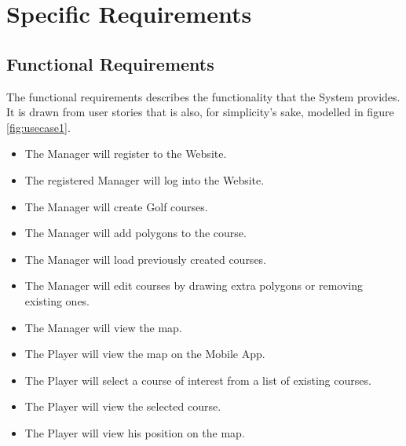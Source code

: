 \documentclass{article}
\begin{document}
    \newpage

    \section{Specific Requirements}

    \subsection{Functional Requirements}
    The functional requirements describes the functionality that the System provides. It is drawn from user stories that is also, for simplicity's sake, modelled in figure \ref{fig:usecase1}.
    \begin{itemize}
        \item
            The Manager will register to the Website.
        \item
            The registered Manager will log into the Website.
        \item
            The Manager will create Golf courses.
        \item
            The Manager will add polygons to the course.
        \item
            The Manager will load previously created courses.
        \item
            The Manager will edit courses by drawing extra polygons or removing existing ones.
        \item
        	The Manager will view the map.
        \item
            The Player will view the map on the Mobile App.
        \item
            The Player will select a course of interest  from a list of existing courses.
        \item
            The Player will view the selected course.
        \item
        	The Player will view his position on the map.
    \end{itemize}
    
\end{document}
